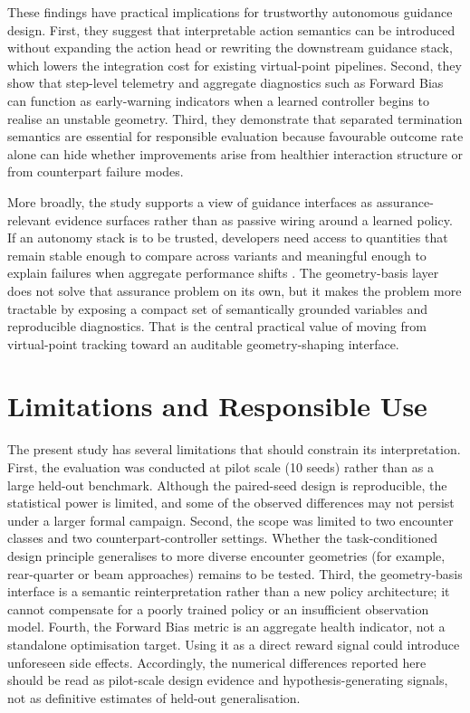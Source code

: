 \documentclass[drones,article,submit,pdftex,moreauthors]{Definitions/mdpi}
\begin{document}
These findings have practical implications for trustworthy autonomous guidance design. First, they suggest that interpretable action semantics can be introduced without expanding the action head or rewriting the downstream guidance stack, which lowers the integration cost for existing virtual-point pipelines. Second, they show that step-level telemetry and aggregate diagnostics such as Forward Bias can function as early-warning indicators when a learned controller begins to realise an unstable geometry. Third, they demonstrate that separated termination semantics are essential for responsible evaluation because favourable outcome rate alone can hide whether improvements arise from healthier interaction structure or from counterpart failure modes.

More broadly, the study supports a view of guidance interfaces as assurance-relevant evidence surfaces rather than as passive wiring around a learned policy. If an autonomy stack is to be trusted, developers need access to quantities that remain stable enough to compare across variants and meaningful enough to explain failures when aggregate performance shifts \cite{paterson2025}. The geometry-basis layer does not solve that assurance problem on its own, but it makes the problem more tractable by exposing a compact set of semantically grounded variables and reproducible diagnostics. That is the central practical value of moving from virtual-point tracking toward an auditable geometry-shaping interface.

\section{Limitations and Responsible Use}

The present study has several limitations that should constrain its interpretation. First, the evaluation was conducted at pilot scale (10 seeds) rather than as a large held-out benchmark. Although the paired-seed design is reproducible, the statistical power is limited, and some of the observed differences may not persist under a larger formal campaign. Second, the scope was limited to two encounter classes and two counterpart-controller settings. Whether the task-conditioned design principle generalises to more diverse encounter geometries (for example, rear-quarter or beam approaches) remains to be tested. Third, the geometry-basis interface is a semantic reinterpretation rather than a new policy architecture; it cannot compensate for a poorly trained policy or an insufficient observation model. Fourth, the Forward Bias metric is an aggregate health indicator, not a standalone optimisation target. Using it as a direct reward signal could introduce unforeseen side effects. Accordingly, the numerical differences reported here should be read as pilot-scale design evidence and hypothesis-generating signals, not as definitive estimates of held-out generalisation.
\end{document}
